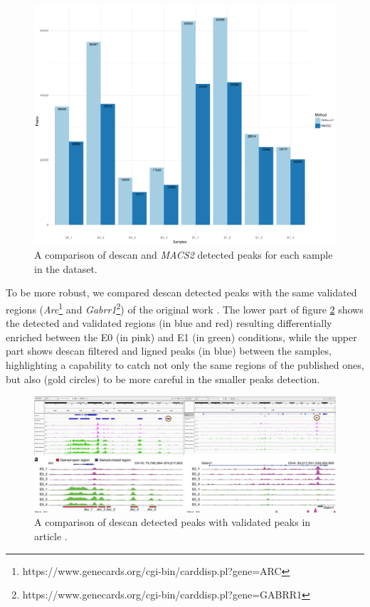 \begin{figure}[H]
\includegraphics[width=\textwidth,height=\textheight,keepaspectratio]{img/descan2/d2m2_peaks_number.png}
\caption[The \gls{descan} and \textit{MACS2} peaks detection]{A comparison of \gls{descan} and \textit{MACS2} detected peaks for each sample in the dataset.}
\label{fig:des2m2peaks}
\centering
\end{figure}

To be more robust, we compared \gls{descan} detected peaks with the same validated regions (\textit{Arc}\footnote{https://www.genecards.org/cgi-bin/carddisp.pl?gene=ARC} and \textit{Gabrr1}\footnote{https://www.genecards.org/cgi-bin/carddisp.pl?gene=GABRR1}) of the original work \cite{Su2017}.
The lower part of figure \ref{fig:peaksdescan} shows the detected and validated regions (in blue and red) resulting differentially enriched between the E0 (in pink) and E1 (in green) conditions, while the upper part shows \gls{descan} filtered and ligned peaks (in blue) between the samples, highlighting a capability to catch not only the same regions of the published ones, but also (gold circles) to be more careful in the smaller peaks detection.

\begin{figure}[H]
\includegraphics[width=\textwidth,height=\textheight,keepaspectratio]{img/descan2/peaks.png}
\caption[\gls{descan} peaks detection]{A comparison of \gls{descan} detected peaks with validated peaks in article \cite{Su2017}.}
\label{fig:peaksdescan}
\centering
\end{figure}

